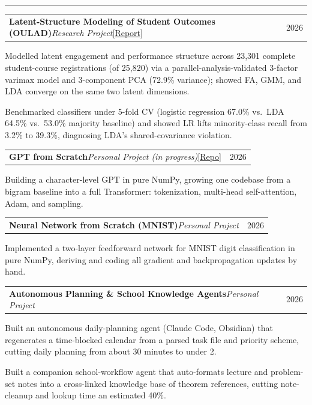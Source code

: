 \documentclass[letterpaper,10pt]{article}
\makeatletter
\newcommand{\Section}[1]{\vspace{4pt}{\large\bfseries #1}\vspace{1pt}\hrule\vspace{3pt}}
\newcommand{\projentry}[2]{%
  \vspace{2pt}%
  \begin{tabular*}{\textwidth}{@{}l@{\extracolsep{\fill}}r@{}}
    #1 & #2 \\
  \end{tabular*}\vspace{-4pt}}
\newenvironment{bullets}%
  {\begin{list}{\textbullet}{%
     \setlength{\leftmargin}{1.3em}\setlength{\labelsep}{0.5em}%
     \setlength{\itemsep}{1.5pt}\setlength{\topsep}{2pt}%
     \setlength{\parsep}{0pt}\setlength{\partopsep}{0pt}}}%
  {\end{list}}
\makeatother
\begin{document}
\Section{Projects}
\projentry{\textbf{Latent-Structure Modeling of Student Outcomes (OULAD)}\quad\textit{Research Project}\quad\href{https://avi-gobrin.github.io/personal-site/assets/oulad-sta437.pdf}{[Report]}}{2026}
\begin{bullets}
  \item Modelled latent engagement and performance structure across 23,301 complete student-course registrations (of 25,820) via a parallel-analysis-validated 3-factor varimax model and 3-component PCA (72.9\% variance); showed FA, GMM, and LDA converge on the same two latent dimensions.
  \item Benchmarked classifiers under 5-fold CV (logistic regression 67.0\% vs.\ LDA 64.5\% vs.\ 53.0\% majority baseline) and showed LR lifts minority-class recall from 3.2\% to 39.3\%, diagnosing LDA's shared-covariance violation.
\end{bullets}
\projentry{\textbf{GPT from Scratch}\quad\textit{Personal Project (in progress)}\quad\href{https://github.com/Avi-Gobrin/tiny-gpt-from-scratch}{[Repo]}}{2026}
\begin{bullets}
  \item Building a character-level GPT in pure NumPy, growing one codebase from a bigram baseline into a full Transformer: tokenization, multi-head self-attention, Adam, and sampling.
\end{bullets}
\projentry{\textbf{Neural Network from Scratch (MNIST)}\quad\textit{Personal Project}}{2026}
\begin{bullets}
  \item Implemented a two-layer feedforward network for MNIST digit classification in pure NumPy, deriving and coding all gradient and backpropagation updates by hand. %
\end{bullets}
\projentry{\textbf{Autonomous Planning \& School Knowledge Agents}\quad\textit{Personal Project}}{2026}
\begin{bullets}
  \item Built an autonomous daily-planning agent (Claude Code, Obsidian) that regenerates a time-blocked calendar from a parsed task file and priority scheme, cutting daily planning from about 30 minutes to under 2.
  \item Built a companion school-workflow agent that auto-formats lecture and problem-set notes into a cross-linked knowledge base of theorem references, cutting note-cleanup and lookup time an estimated 40\%.
\end{bullets}
\end{document}
